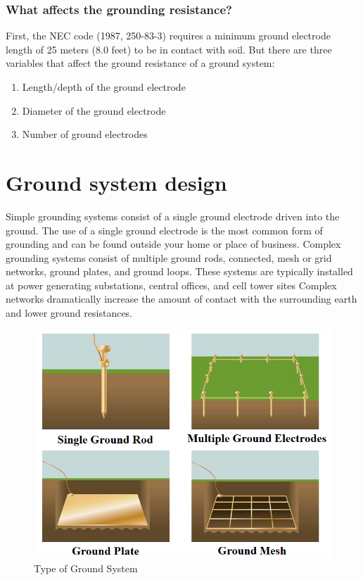 \documentclass[12pt,fleqn]{book} %
\begin{document}
\subsubsection{What affects the grounding resistance?}
First, the NEC code (1987, 250-83-3) requires a minimum ground electrode length of 25 meters (8.0 feet) to be in contact with soil. But there are three variables that affect the ground resistance of a ground system:
\begin{enumerate}
    \item Length/depth of the ground electrode
    \item Diameter of the ground electrode
    \item Number of ground electrodes
\end{enumerate}
\section{Ground system design}
Simple grounding systems consist of a single ground electrode driven into the ground. The use of a single ground electrode is the most common form of grounding and can be found outside your home or place of business. Complex grounding systems consist of multiple ground rods, connected, mesh or grid networks, ground plates, and ground loops. These systems are typically installed at power generating substations, central offices, and cell tower sites Complex networks dramatically increase the amount of contact with the surrounding earth and lower ground resistances.
\begin{figure}[!h]
    \centering
    \includegraphics[width=0.8\linewidth]{earth 2.png}
    \caption{Type of Ground System}
    \label{fig:earth 2}
\end{figure}
\end{document}
